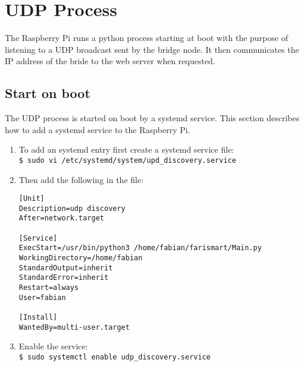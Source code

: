 \section{UDP Process}
The Raspberry Pi runs a python process starting at boot with
the purpose of listening to a UDP broadcast sent by the bridge
node. It then communicates the IP address of the bride to the
web server when requested.

    \subsection{Start on boot}
    The UDP process is started on boot by a systemd service.
    This section describes how to add a systemd service to the
    Raspberry Pi.

    \begin{enumerate}
        \item To add an systemd entry first create a systemd service file: \\
        \texttt{\$ sudo vi /etc/systemd/system/upd\_discovery.service}

        \item Then add the following in the file:
        \begin{verbatim}
[Unit]
Description=udp discovery
After=network.target

[Service]
ExecStart=/usr/bin/python3 /home/fabian/farismart/Main.py
WorkingDirectory=/home/fabian
StandardOutput=inherit
StandardError=inherit
Restart=always
User=fabian

[Install]
WantedBy=multi-user.target
        \end{verbatim}
        \item Enable the service: \\
        \texttt{\$ sudo systemctl enable udp\_discovery.service}
    \end{enumerate}
    